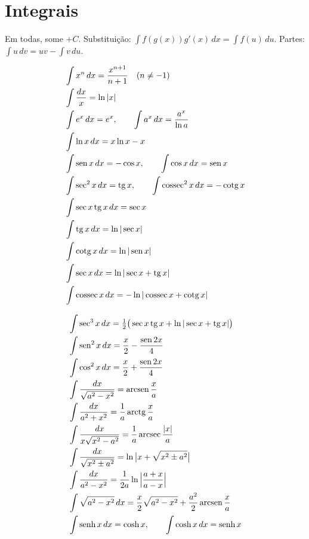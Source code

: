 \clearpage
\section{Integrais}
{\small Em todas, some $+C$. Substituição: $\int f(g(x))g'(x)\,dx=\int f(u)\,du$. Partes:
$\int u\,dv=uv-\int v\,du$.}

{\small\noindent\begin{minipage}[t]{0.44\linewidth}\vspace{0pt}
\[\begin{aligned}
&\int x^n\,dx=\frac{x^{n+1}}{n+1}\quad(n\ne-1)\\
&\int\frac{dx}x=\ln|x|\\
&\int e^x\,dx=e^x,\qquad \int a^x\,dx=\frac{a^x}{\ln a}\\
&\int\ln x\,dx=x\ln x-x\\
&\int\operatorname{sen} x\,dx=-\cos x,\qquad \int\cos x\,dx=\operatorname{sen} x\\
&\int\sec^2x\,dx=\operatorname{tg} x,\qquad \int\operatorname{cossec}^2x\,dx=-\operatorname{cotg} x\\
&\int\sec x\operatorname{tg} x\,dx=\sec x\\
&\int\operatorname{tg} x\,dx=\ln|\sec x|\\
&\int\operatorname{cotg} x\,dx=\ln|\operatorname{sen} x|\\
&\int\sec x\,dx=\ln|\sec x+\operatorname{tg} x|\\
&\int\operatorname{cossec} x\,dx=-\ln|\operatorname{cossec} x+\operatorname{cotg} x|
\end{aligned}\]
\end{minipage}\hfill\begin{minipage}[t]{0.54\linewidth}\vspace{0pt}
\[\begin{aligned}
&\int\sec^3x\,dx=\tfrac12\big(\sec x\operatorname{tg} x+\ln|\sec x+\operatorname{tg} x|\big)\\
&\int\operatorname{sen}^2x\,dx=\frac x2-\frac{\operatorname{sen}2x}4\\
&\int\cos^2x\,dx=\frac x2+\frac{\operatorname{sen}2x}4\\
&\int\frac{dx}{\sqrt{a^2-x^2}}=\operatorname{arcsen}\frac xa\\
&\int\frac{dx}{a^2+x^2}=\frac1a\operatorname{arctg}\frac xa\\
&\int\frac{dx}{x\sqrt{x^2-a^2}}=\frac1a\operatorname{arcsec}\frac{|x|}a\\
&\int\frac{dx}{\sqrt{x^2\pm a^2}}=\ln\big|x+\sqrt{x^2\pm a^2}\big|\\
&\int\frac{dx}{a^2-x^2}=\frac1{2a}\ln\Big|\frac{a+x}{a-x}\Big|\\
&\int\sqrt{a^2-x^2}\,dx=\frac x2\sqrt{a^2-x^2}+\frac{a^2}2\operatorname{arcsen}\frac xa\\
&\int\operatorname{senh} x\,dx=\cosh x,\qquad \int\cosh x\,dx=\operatorname{senh} x
\end{aligned}\]
\end{minipage}\par}

